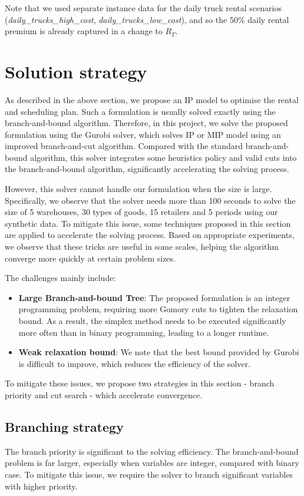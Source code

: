 \documentclass[a4paper,12pt]{article}
\begin{document}
Note that we used separate instance data for the daily truck rental scenarios (\textit{daily\_trucks\_high\_cost}, \textit{daily\_trucks\_low\_cost}), and so the 50\% daily rental premium is already captured in a change to $R_T$.


\section{Solution strategy}\label{sec:solution-strategy}

As described in the above section, we propose an IP model to optimise the rental and scheduling plan.
Such a formulation is usually solved exactly using the branch-and-bound algorithm.
Therefore, in this project, we solve the proposed formulation using the Gurobi solver, which solves IP or MIP model using an improved branch-and-cut algorithm.
Compared with the standard branch-and-bound algorithm, this solver integrates some heuristics policy and valid cuts into the branch-and-bound algorithm, significantly accelerating the solving process.

However, this solver cannot handle our formulation when the size is large.
Specifically, we observe that the solver needs more than 100 seconds to solve the size of 5 warehouses, 30 types of goods, 15 retailers and 5 periods using our synthetic data.
To mitigate this issue, some techniques proposed in this section are applied to accelerate the solving process.
Based on appropriate experiments, we observe that these tricks are useful in some scales, helping the algorithm converge more quickly at certain problem sizes.

The challenges mainly include:
\begin{itemize}
    \item \textbf{Large Branch-and-bound Tree}: The proposed formulation is an integer programming problem, requiring more Gomory cuts to tighten the relaxation bound.
    As a result, the simplex method needs to be executed significantly more often than in binary programming, leading to a longer runtime.
    \item \textbf{Weak relaxation bound}: We note that the best bound provided by Gurobi is difficult to improve, which reduces the efficiency of the solver.
\end{itemize}

To mitigate these issues, we propose two strategies in this section - branch priority and cut search - which accelerate convergence.

\subsection{Branching strategy}\label{subsec:branching-strategy}
The branch priority is significant to the solving efficiency.
The branch-and-bound problem is far larger, especially when variables are integer, compared with binary case.
To mitigate this issue, we require the solver to branch significant variables with higher priority.
\end{document}
